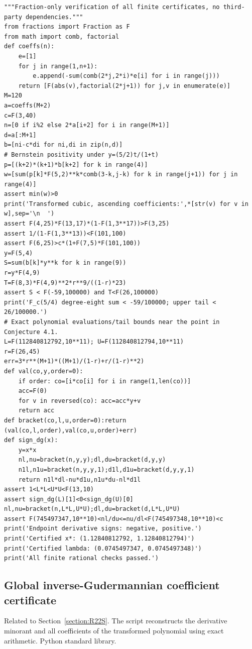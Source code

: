 \documentclass[11pt,a4paper]{article}
\begin{document}
\begin{Verbatim}[fontsize=\scriptsize,breaklines,breakanywhere]
"""Fraction-only verification of all finite certificates, no third-party dependencies."""
from fractions import Fraction as F
from math import comb, factorial
def coeffs(n):
    e=[1]
    for j in range(1,n+1):
        e.append(-sum(comb(2*j,2*i)*e[i] for i in range(j)))
    return [F(abs(v),factorial(2*j+1)) for j,v in enumerate(e)]
M=120
a=coeffs(M+2)
c=F(3,40)
n=[0 if i%2 else 2*a[i+2] for i in range(M+1)]
d=a[:M+1]
b=[ni-c*di for ni,di in zip(n,d)]
# Bernstein positivity under y=(5/2)t/(1+t)
p=[(k+2)*(k+1)*b[k+2] for k in range(4)]
w=[sum(p[k]*F(5,2)**k*comb(3-k,j-k) for k in range(j+1)) for j in range(4)]
assert min(w)>0
print('Transformed cubic, ascending coefficients:',*[str(v) for v in w],sep='\n  ')
assert F(4,25)*F(13,17)*(1-F(1,3**17))>F(3,25)
assert 1/(1-F(1,3**13))<F(101,100)
assert F(6,25)>c*(1+F(7,5)*F(101,100))
y=F(5,4)
S=sum(b[k]*y**k for k in range(9))
r=y*F(4,9)
T=F(8,3)*F(4,9)**2*r**9/((1-r)*23)
assert S < F(-59,100000) and T<F(26,100000)
print('F_c(5/4) degree-eight sum < -59/100000; upper tail < 26/100000.')
# Exact polynomial evaluations/tail bounds near the point in Conjecture 4.1.
L=F(112840812792,10**11); U=F(112840812794,10**11)
r=F(26,45)
err=3*r**(M+1)*((M+1)/(1-r)+r/(1-r)**2)
def val(co,y,order=0):
    if order: co=[i*co[i] for i in range(1,len(co))]
    acc=F(0)
    for v in reversed(co): acc=acc*y+v
    return acc
def bracket(co,l,u,order=0):return (val(co,l,order),val(co,u,order)+err)
def sign_dg(x):
    y=x*x
    nl,nu=bracket(n,y,y);dl,du=bracket(d,y,y)
    n1l,n1u=bracket(n,y,y,1);d1l,d1u=bracket(d,y,y,1)
    return n1l*dl-nu*d1u,n1u*du-nl*d1l
assert 1<L*L<U*U<F(13,10)
assert sign_dg(L)[1]<0<sign_dg(U)[0]
nl,nu=bracket(n,L*L,U*U);dl,du=bracket(d,L*L,U*U)
assert F(745497347,10**10)<nl/du<=nu/dl<F(745497348,10**10)<c
print('Endpoint derivative signs: negative, positive.')
print('Certified x*: (1.12840812792, 1.12840812794)')
print('Certified lambda: (0.0745497347, 0.0745497348)')
print('All finite rational checks passed.')
\end{Verbatim}
\subsection{Global inverse-Gudermannian coefficient certificate}
\noindent Related to Section~\ref{section:R22S}. The script reconstructs the derivative minorant and all coefficients of the transformed polynomial using exact arithmetic. Python standard library.
\end{document}
